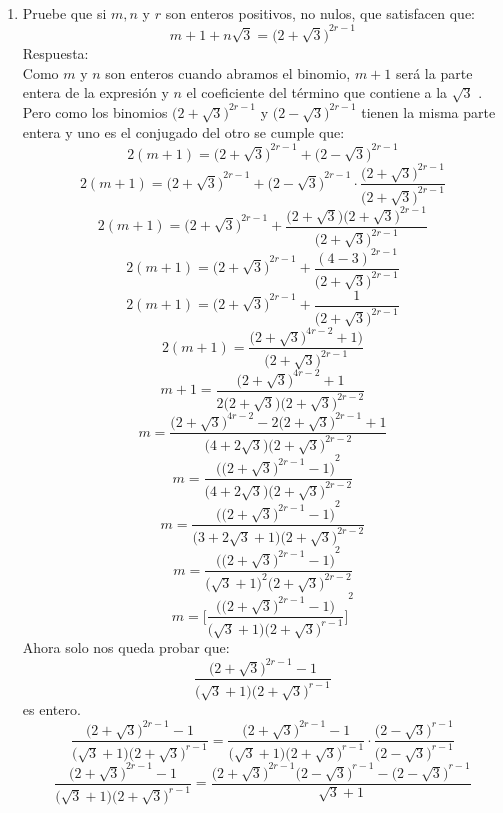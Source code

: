\documentclass{book}
\begin{document}
\begin{enumerate}
    \item Pruebe que si $m,n$  y $r$  son enteros positivos, no nulos, que satisfacen que:
          $$m+1+n\sqrt{3}={\big(2+\sqrt{3}\big)}^{2r-1}$$
          Respuesta:\\
          Como $m$ y $n$ son enteros cuando abramos el binomio, $m+1$ será la parte entera de la expresión y $n$ el coeficiente del término que contiene a la $\sqrt{3}$ .\\
          Pero como los binomios ${\big(2+\sqrt{3}\big)}^{2r-1}$ y ${\big(2-\sqrt{3}\big)}^{2r-1}$ tienen la misma parte entera y uno es el conjugado del otro se cumple que:
          $$2(m+1)={\big(2+\sqrt{3}\big)}^{2r-1}+{\big(2-\sqrt{3}\big)}^{2r-1}$$
          $$2(m+1)={\big(2+\sqrt{3}\big)}^{2r-1}+{\big(2-\sqrt{3}\big)}^{2r-1}\cdot\frac{{\big(2+\sqrt{3}\big)}^{2r-1}}{{\big(2+\sqrt{3}\big)}^{2r-1}}$$
          $$2(m+1)={\big(2+\sqrt{3}\big)}^{2r-1}+\frac{{\big(2+\sqrt{3}\big)\big(2+\sqrt{3}\big)}^{2r-1}}{{\big(2+\sqrt{3}\big)}^{2r-1}} $$
          $$2(m+1)={\big(2+\sqrt{3}\big)}^{2r-1}+\frac{{(4-3)}^{2r-1}}{{\big(2+\sqrt{3}\big)}^{2r-1}} $$
          $$2(m+1)={\big(2+\sqrt{3}\big)}^{2r-1}+\frac{1}{{\big(2+\sqrt{3}\big)}^{2r-1}}$$
          $$2(m+1)=\frac{{\big(2+\sqrt{3}\big)}^{4r-2}+1)}{{\big(2+\sqrt{3}\big)}^{2r-1}}$$
          $$m+1=\frac{{\big(2+\sqrt{3}\big)}^{4r-2}+1}{2\big(2+\sqrt{3}\big){\big(2+\sqrt{3}\big)}^{2r-2}}$$
          $$m=\frac{{\big(2+\sqrt{3}\big)}^{4r-2}-2{\big(2+\sqrt{3}\big)}^{2r-1}+1}{\big(4+2\sqrt{3}\big){\big(2+\sqrt{3}\big)}^{2r-2} }$$
          $$m=\frac{{\Big({\big(2+\sqrt{3}\big)}^{2r-1}-1\Big)}^2}{ \big(4+2\sqrt{3}\big){\big(2+\sqrt{3}\big)}^{2r-2} }$$
          $$m=\frac{{\Big({\big(2+\sqrt{3}\big)}^{2r-1}-1\Big)}^2}{ \big(3+2\sqrt{3}+1\big){\big(2+\sqrt{3}\big)}^{2r-2}}$$
          $$m=\frac{{\Big({\big(2+\sqrt{3}\big)}^{2r-1}-1\Big)}^2}{{\big(\sqrt{3}+1\big)}^2{\big(2+\sqrt{3}\big)}^{2r-2}}$$
          $$m={\Bigg[\frac{\Big({\big(2+\sqrt{3}\big)}^{2r-1}-1\Big)}{\big(\sqrt{3}+1\big){\big(2+\sqrt{3}\big)}^{r-1}}\Bigg]}^2$$
          Ahora solo nos queda probar que:
          $$\frac{{\big(2+\sqrt{3}\big)}^{2r-1}-1}{\big(\sqrt{3}+1\big){\big(2+\sqrt{3}\big)}^{r-1}}$$
          es entero.
          $$\frac{{\big(2+\sqrt{3}\big)}^{2r-1}-1}{\big(\sqrt{3}+1\big){\big(2+\sqrt{3}\big)}^{r-1}}=\frac{{\big(2+\sqrt{3}\big)}^{2r-1}-1}{\big(\sqrt{3}+1\big){\big(2+\sqrt{3}\big)}^{r-1}}\cdot\frac{{\big(2-\sqrt{3}\big)}^{r-1}}{{\big(2-\sqrt{3}\big)}^{r-1}}$$
          $$\frac{{\big(2+\sqrt{3}\big)}^{2r-1}-1}{\big(\sqrt{3}+1\big){\big(2+\sqrt{3}\big)}^{r-1}}=\frac{{\big(2+\sqrt{3}\big)}^{2r-1}{\big(2-\sqrt{3}\big)}^{r-1}-{\big(2-\sqrt{3}\big)}^{r-1}}{\sqrt{3}+1}$$

\end{enumerate}
\end{document}

